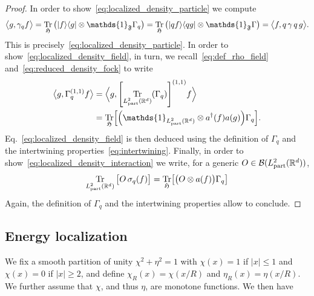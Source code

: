 \documentclass[AHL,Unicode,longabstracts,published]{cedram}
\newcommand{\bra}[1]{\left\langle #1\right|}
\newcommand{\ket}[1]{\left|#1\right\rangle}
\DeclareMathOperator{\Tr}{Tr}
\DeclareMathOperator{\partt}{part}
\newcommand{\R}{\mathbb{R}}
\newcommand{\gH}{\mathfrak{H}}
\newcommand{\gF}{\mathfrak{F}}
\newcommand{\cB}{\mathcal{B}}
\newcommand{\1}{\mathds{1}}
\let\oldin\in
\renewcommand{\in}{\mathchoice{\oldin}{\oldin}{\,\oldin\,}{\,\oldin\,}}
\let\originalleft\left
\let\originalright\right
\renewcommand{\left}{\mathopen{}\mathclose\bgroup\originalleft}
\renewcommand{\right}{\aftergroup\egroup\originalright}
\begin{document}
\begin{proof}
In order to show~\eqref{eq:localized_density_particle} we compute
\begin{equation}
\big\langle g,\gamma_q f \big\rangle =\Tr_{ \gH}\big(\ket{f}\bra{g} \otimes \1_{\gF} \Gamma_q\big)=\Tr_{ \gH} \big(\ket{qf} \bra{qg} \otimes \1_{\gF}\Gamma \big)= \big\langle f,q\, \gamma\, q\, g \big\rangle.
\end{equation}
This is precisely~\eqref{eq:localized_density_particle}. In order to show~\eqref{eq:localized_density_field}, in turn, we recall~\eqref{eq:def_rho_field} and~\eqref{eq:reduced_density_fock} to write
\begin{equation}
\begin{split}
\big\langle g, \Gamma^{(1,1)}_qf\big\rangle &= \Big\langle g, \left[\Tr_{L^2_{\partt}(\R^d)}(\Gamma_q)\right]^{(1,1)}f \Big\rangle\\
&= \Tr_{ \gH} \left[\left(\1_{L^2_{\partt}(\R^d)}\otimes a^\dagger(f) a(g)\right) \Gamma_q \right].
\end{split}
\end{equation}
Eq.~\eqref{eq:localized_density_field} is then deduced using the definition of $\Gamma_q$ and the intertwining properties~\eqref{eq:intertwining}. Finally, in order to show~\eqref{eq:localized_density_interaction} we write, for a generic $O\in \cB(L^2_{\partt}(\R^d))$,
\begin{equation*}
\Tr_{L^2_{\partt}(\R^d)}\big[O\, \sigma_{q}(f) \big]=\Tr_{ \gH}\left[\big(O \otimes a(f)\big)\Gamma_q\right]
\end{equation*}
Again, the definition of $\Gamma_q$ and the intertwining properties allow to conclude.
\end{proof}

\subsection{Energy localization}\label{sec:loc}

We fix a smooth partition of unity $\chi^2+\eta^2=1$ with $\chi(x)=1$ if $|x|\le 1$ and $\chi(x)=0$ if $|x|\ge2$, and define $\chi_R(x)=\chi(x/R)$ and $\eta_R(x)=\eta(x/R)$. We further assume that $\chi$, and thus $\eta$, are monotone functions. We then have
\end{document}
